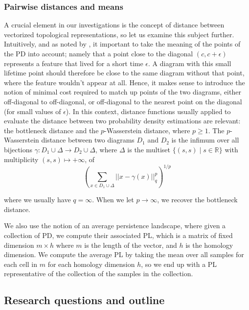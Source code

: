 \documentclass{article}
\begin{document}
\subsubsection{Pairwise distances and means}

A crucial element in our investigations is the concept of distance between vectorized topological representations, so let us examine this subject further. Intuitively, and as noted by \citep{berwald2018computing}, it important to take the meaning of the points of the PD into account; namely that a point close to the diagonal $(c,c+\epsilon)$ represents a feature that lived for a short time $\epsilon$. A diagram with this small lifetime point should therefore be close to the same diagram without that point, where the feature wouldn't appear at all. Hence, it makes sense to introduce the notion of minimal cost required to match up points of the two diagrams, either off-diagonal to off-diagonal, or off-diagonal to  the nearest point on the diagonal (for small values of $\epsilon$). In this context, distance functions usually applied to evaluate the distance between two probability density estimations are relevant: the bottleneck distance and the $p$-Wasserstein distance, where $p\geq 1$. The $p$-Wasserstein distance between two diagrams $D_1$ and $D_2$ is the infimum over all bijections $\gamma: D_1 \cup \Delta \to D_2 \cup \Delta$, where $\Delta$ is the multiset $\lbrace (s, s) \mid s \in \mathbb{R} \rbrace$ with multiplicity $(s,s) \mapsto +\infty$, of
\begin{equation}
  \label{eq:wasserstein_distance}
  \left(\sum_{x \in D_1 \cup \Delta} ||x - \gamma(x)||_q^p \right)^{1/p}
\end{equation}

where we usually have $q=\infty$. When we let $p\to\infty$, we recover the bottleneck distance.

We also use the notion of an average persistence landscape, where given a collection of PD, we compute their associated PL, which is a matrix of fixed dimension $m\times h$ where $m$ is the length of the vector, and $h$ is the homology dimension. We compute the average PL by taking the mean over all samples for each cell in $m$ for each homology dimension $h$, so we end up with a PL representative of the collection of the samples in the collection.

\subsection{Research questions and outline}
\end{document}
